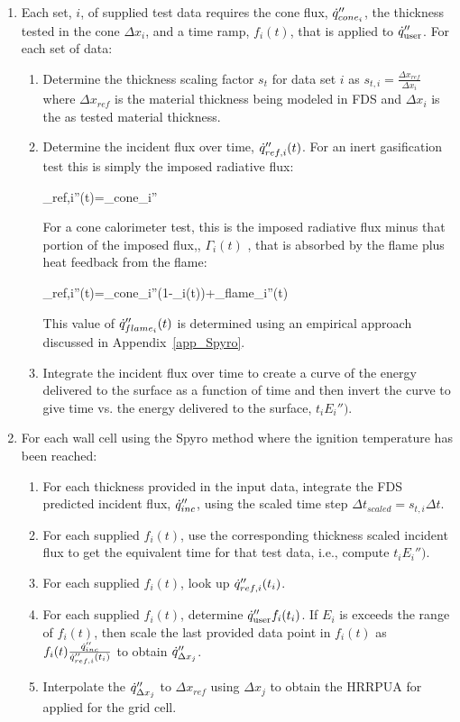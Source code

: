 \begin{enumerate}
	\item Each set, $i$, of supplied test data requires the cone flux, $\dot{q}_{cone_i}''$, the thickness tested in the cone ${\Delta x_i}$, and a time ramp, $f_i(t)$, that is applied to $\dot{q}_{\rm user}''$. For each set of data:
	\begin{enumerate}
		\item Determine the thickness scaling factor $s_t$ for data set $i$ as $s_{t,i} = \frac{\Delta x_{ref}}{\Delta x_i}$ where $\Delta x_{ref}$ is the material thickness being modeled in FDS and $\Delta x_i$ is the as tested material thickness.
		\item Determine the incident flux over time, $\dot{q}_{ref,i}''(t)$. For an inert gasification test this is simply the imposed radiative flux:
		
		\be  \dq_{ref,i}''(t)=\dq_{cone_i}'' \ee
		
		For a cone calorimeter test, this is the imposed radiative flux minus that portion of the imposed flux,, $\Gamma_i(t)$ , that is absorbed by the flame plus heat feedback from the flame:
		
		\be \dq_{ref,i}''(t)=\dq_{cone_i}''(1-\Gamma_i(t))+\dq_{flame_i}''(t) \ee
		
		This value of $\dot{q}_{flame_i}''(t)$ is determined using an empirical approach discussed in Appendix~\ref{app_Spyro}.
		\item Integrate the incident flux over time to create a curve of the energy delivered to the surface as a function of time and then invert the curve to give time vs. the energy delivered to the surface, $t_i{E_i'')}$.
	\end{enumerate}
	\item For each wall cell using the Spyro method where the ignition temperature has been reached:
	\begin{enumerate}
		\item For each thickness provided in the input data, integrate the FDS predicted incident flux, $\dot{q}_{inc}''$, using the scaled time step $\Delta t_{scaled}=s_{t,i} \Delta t$.
		\item For each supplied $f_i(t)$, use the corresponding thickness scaled incident flux to get the equivalent time for that test data, i.e., compute $t_i{E_i'')}$.
		\item For each supplied $f_i(t)$, look up $\dot{q}_{ref,i}''(t_i)$.
		\item For each supplied $f_i(t)$, determine $\dot{q}_{\rm user}''f_i(t_i)$. If ${E_i}$ is exceeds the range of  $f_i(t)$, then scale the last provided data point in $f_i(t)$ as $ f_i(t) \frac{\dot{q}_{inc}''}{\dot{q}_{ref,i}''(t_i)}$ to obtain $\dot{q}_{\Delta x_j}''$.
		\item Interpolate the $\dot{q}_{\Delta x_j}''$ to $\Delta x_{ref}$ using $\Delta x_j$ to obtain the HRRPUA for applied for the grid cell.
	\end{enumerate}
\end{enumerate}



